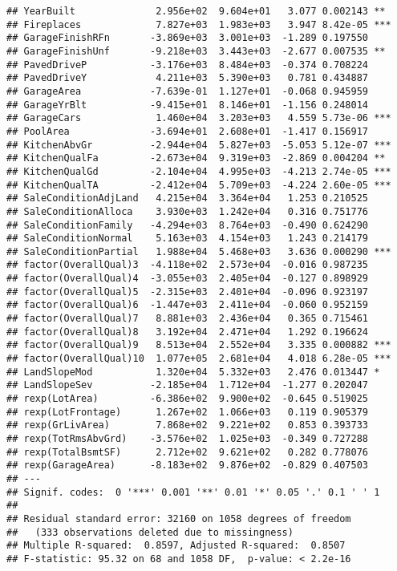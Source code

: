 \documentclass[
]{article}
\begin{document}
\begin{verbatim}
## YearBuilt              2.956e+02  9.604e+01   3.077 0.002143 ** 
## Fireplaces             7.827e+03  1.983e+03   3.947 8.42e-05 ***
## GarageFinishRFn       -3.869e+03  3.001e+03  -1.289 0.197550    
## GarageFinishUnf       -9.218e+03  3.443e+03  -2.677 0.007535 ** 
## PavedDriveP           -3.176e+03  8.484e+03  -0.374 0.708224    
## PavedDriveY            4.211e+03  5.390e+03   0.781 0.434887    
## GarageArea            -7.639e-01  1.127e+01  -0.068 0.945959    
## GarageYrBlt           -9.415e+01  8.146e+01  -1.156 0.248014    
## GarageCars             1.460e+04  3.203e+03   4.559 5.73e-06 ***
## PoolArea              -3.694e+01  2.608e+01  -1.417 0.156917    
## KitchenAbvGr          -2.944e+04  5.827e+03  -5.053 5.12e-07 ***
## KitchenQualFa         -2.673e+04  9.319e+03  -2.869 0.004204 ** 
## KitchenQualGd         -2.104e+04  4.995e+03  -4.213 2.74e-05 ***
## KitchenQualTA         -2.412e+04  5.709e+03  -4.224 2.60e-05 ***
## SaleConditionAdjLand   4.215e+04  3.364e+04   1.253 0.210525    
## SaleConditionAlloca    3.930e+03  1.242e+04   0.316 0.751776    
## SaleConditionFamily   -4.294e+03  8.764e+03  -0.490 0.624290    
## SaleConditionNormal    5.163e+03  4.154e+03   1.243 0.214179    
## SaleConditionPartial   1.988e+04  5.468e+03   3.636 0.000290 ***
## factor(OverallQual)3  -4.118e+02  2.573e+04  -0.016 0.987235    
## factor(OverallQual)4  -3.055e+03  2.405e+04  -0.127 0.898929    
## factor(OverallQual)5  -2.315e+03  2.401e+04  -0.096 0.923197    
## factor(OverallQual)6  -1.447e+03  2.411e+04  -0.060 0.952159    
## factor(OverallQual)7   8.881e+03  2.436e+04   0.365 0.715461    
## factor(OverallQual)8   3.192e+04  2.471e+04   1.292 0.196624    
## factor(OverallQual)9   8.513e+04  2.552e+04   3.335 0.000882 ***
## factor(OverallQual)10  1.077e+05  2.681e+04   4.018 6.28e-05 ***
## LandSlopeMod           1.320e+04  5.332e+03   2.476 0.013447 *  
## LandSlopeSev          -2.185e+04  1.712e+04  -1.277 0.202047    
## rexp(LotArea)         -6.386e+02  9.900e+02  -0.645 0.519025    
## rexp(LotFrontage)      1.267e+02  1.066e+03   0.119 0.905379    
## rexp(GrLivArea)        7.868e+02  9.221e+02   0.853 0.393733    
## rexp(TotRmsAbvGrd)    -3.576e+02  1.025e+03  -0.349 0.727288    
## rexp(TotalBsmtSF)      2.712e+02  9.621e+02   0.282 0.778076    
## rexp(GarageArea)      -8.183e+02  9.876e+02  -0.829 0.407503    
## ---
## Signif. codes:  0 '***' 0.001 '**' 0.01 '*' 0.05 '.' 0.1 ' ' 1
## 
## Residual standard error: 32160 on 1058 degrees of freedom
##   (333 observations deleted due to missingness)
## Multiple R-squared:  0.8597, Adjusted R-squared:  0.8507 
## F-statistic: 95.32 on 68 and 1058 DF,  p-value: < 2.2e-16
\end{verbatim}
\end{document}
